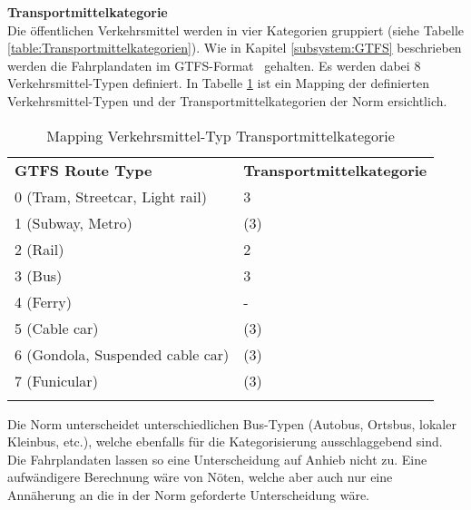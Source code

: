 \textbf{Transportmittelkategorie}\\
Die öffentlichen Verkehrsmittel werden in vier Kategorien gruppiert (siehe Tabelle \ref{table:Transportmittelkategorien}).
Wie in Kapitel \ref{subsystem:GTFS} beschrieben werden die Fahrplandaten im \acs{GTFS}-Format~\cite{gtfs_spec} gehalten. 
Es werden dabei 8 Verkehrsmittel-Typen definiert.
In Tabelle \ref{table:Mapping Verkehrsmittel-Typ Transportmittelkategorie} ist ein Mapping der definierten Verkehrsmittel-Typen und der Transportmittelkategorien der Norm ersichtlich.

\begin{longtable}[ht]{l l}
        \midrule
            \textbf{GTFS Route Type} 
            & \textbf{Transportmittelkategorie}\\
            
            0 (Tram, Streetcar, Light rail)
            & 3\\
            
            1 (Subway, Metro)
            & (3)\\
            
            2 (Rail)
            & 2\\
            
            3 (Bus)
            & 3\\
            
            4 (Ferry)
            & -\\
            
            5 (Cable car)
            & (3)\\
            
            6 (Gondola, Suspended cable car)
            & (3)\\
            
            7 (Funicular)
            & (3)\\            
        \bottomrule
    \caption{Mapping Verkehrsmittel-Typ Transportmittelkategorie}
    \label{table:Mapping Verkehrsmittel-Typ Transportmittelkategorie}
\end{longtable}

Die Norm unterscheidet unterschiedlichen Bus-Typen (Autobus, Ortsbus, lokaler Kleinbus, etc.), welche ebenfalls für die Kategorisierung ausschlaggebend sind.
Die Fahrplandaten lassen so eine Unterscheidung auf Anhieb nicht zu.
Eine aufwändigere Berechnung wäre von Nöten, welche aber auch nur eine Annäherung an die in der Norm geforderte Unterscheidung wäre.

